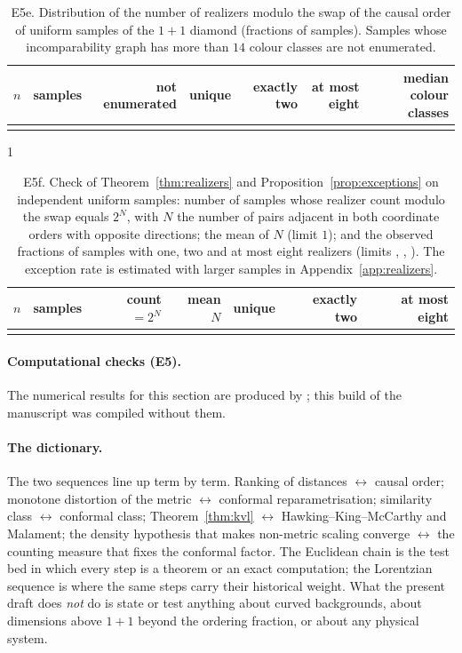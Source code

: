 \documentclass[11pt,a4paper]{article}
\providecommand{\HasRlaw}{0}
\theoremstyle{plain}
\theoremstyle{definition}
\theoremstyle{remark}
\begin{document}
\begin{table}[t]
\centering\small
\begin{tabular}{rrrrrrr}
\toprule
$n$ & samples & not enumerated & unique & exactly two & at most eight & median colour classes\\
\midrule
\\
\bottomrule
\end{tabular}
\caption{E5e. Distribution of the number of realizers modulo the swap of the causal order of uniform samples of the $1{+}1$ diamond (fractions of samples). Samples whose incomparability graph has more than $14$ colour classes are not enumerated.}
\label{tab:e5e}
\end{table}

\if\HasRlaw1
\begin{table}[t]
\centering\small
\begin{tabular}{rrrrrrr}
\toprule
$n$ & samples & count $=2^N$ & mean $N$ & unique & exactly two & at most eight\\
\midrule
\\
\bottomrule
\end{tabular}
\caption{E5f. Check of Theorem~\ref{thm:realizers} and Proposition~\ref{prop:exceptions} on independent uniform samples: number of samples whose realizer count modulo the swap equals $2^N$, with $N$ the number of pairs adjacent in both coordinate orders with opposite directions; the mean of $N$ (limit $1$); and the observed fractions of samples with one, two and at most eight realizers (limits \RlawPoissonOne, \RlawPoissonOne, \RlawPoissonLeThree). The exception rate is estimated with larger samples in Appendix~\ref{app:realizers}.}
\label{tab:e5f}
\end{table}
\fi

\else
\paragraph{Computational checks (E5).}
The numerical results for this section are produced by ; this build of the manuscript was compiled without them.
\fi

\paragraph{The dictionary.}
The two sequences line up term by term. Ranking of distances $\leftrightarrow$ causal order; monotone distortion of the metric $\leftrightarrow$ conformal reparametrisation; similarity class $\leftrightarrow$ conformal class; Theorem~\ref{thm:kvl} $\leftrightarrow$ Hawking--King--McCarthy and Malament; the density hypothesis that makes non-metric scaling converge $\leftrightarrow$ the counting measure that fixes the conformal factor. The Euclidean chain is the test bed in which every step is a theorem or an exact computation; the Lorentzian sequence is where the same steps carry their historical weight. What the present draft does \emph{not} do is state or test anything about curved backgrounds, about dimensions above $1{+}1$ beyond the ordering fraction, or about any physical system.
\end{document}
